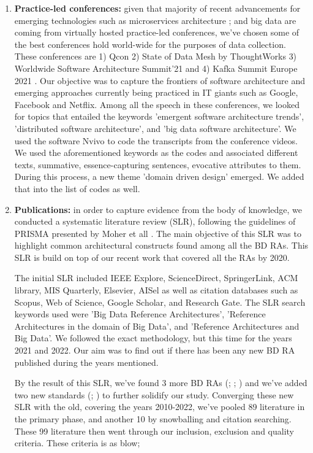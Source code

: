 \documentclass[review]{elsarticle}
\begin{document}
\begin{enumerate}
    \item{\bf{Practice-led conferences:}} given that majority of recent advancements for emerging technologies such as microservices architecture \cite{gan2019open};\cite{laigner2021data} \cite{dragoni2017microservices} and big data are coming from virtually hosted practice-led conferences, we've chosen some of the best conferences hold world-wide for the purposes of data collection. These conferences are 1) Qcon \cite{QCON} 2) State of Data Mesh by ThoughtWorks \cite{ThoughtWorks} 3) Worldwide Software Architecture Summit'21 \cite{Geekle} and 4) Kafka Summit Europe 2021 \cite{KafkaSummit}. Our objective was to capture the frontiers of software architecture and emerging approaches currently being practiced in IT giants such as Google, Facebook and Netflix. Among all the speech in these conferences, we looked for topics that entailed the keywords 'emergent software architecture trends', 'distributed software architecture', and 'big data software architecture'. We used the software Nvivo to code the transcripts from the conference videos. We used the aforementioned keywords as the codes and associated different texts, summative, essence-capturing sentences, evocative attributes to them. During this process, a new theme 'domain driven design' emerged. We added that into the list of codes as well.
    \item{\bf{Publications:}} in order to capture evidence from the body of knowledge, we conducted a systematic literature review (SLR), following the guidelines of PRISMA presented by Moher et all \cite{moher2015preferred}. The main objective of this SLR was to highlight common architectural constructs found among all the BD RAs. This SLR is build on top of our recent work \cite{AtaeiACIS} that covered all the RAs by 2020. 

    The initial SLR included IEEE Explore, ScienceDirect, SpringerLink, ACM library, MIS Quarterly, Elsevier, AISel as well as citation databases such as Scopus, Web of Science, Google Scholar, and Research Gate. The SLR search keywords used were ’Big Data Reference Architectures’, ’Reference Architectures in the domain of Big Data’, and ’Reference Architectures and Big Data’. We followed the exact methodology, but this time for the years 2021 and 2022. Our aim was to find out if there has been any new BD RA published during the years mentioned.

    By the result of this SLR, we've found 3 more BD RAs (\cite{AtaeiApsec}; \cite{castellanos2021smart}; \cite{sang2017simplifying}) and we've added two new standards (\cite{ISO20546}; \cite{ISO20547}) to further solidify our study. Converging these new SLR with the old, covering the years 2010-2022, we've pooled 89 literature in the primary phase, and another 10 by snowballing and citation searching. These 99 literature then went through our inclusion, exclusion and quality criteria. These criteria is as blow; 


\end{enumerate}
\end{document}
